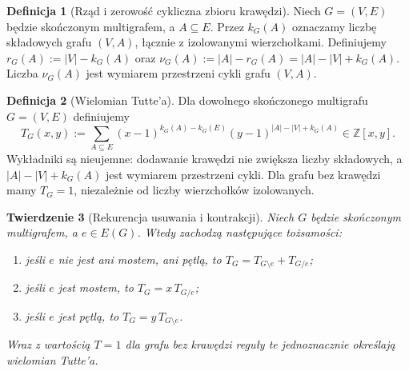 \documentclass[11pt,a4paper]{report}
\numberwithin{equation}{section}
\theoremstyle{plain}
\newtheorem{twierdzenie}{Twierdzenie}[section]
\theoremstyle{definition}
\newtheorem{definicja}[twierdzenie]{Definicja}
\theoremstyle{remark}
\begin{document}
\begin{definicja}[Rząd i zerowość cykliczna zbioru krawędzi]
Niech $G=(V,E)$ będzie skończonym multigrafem, a $A\subseteq E$.
Przez $k_G(A)$ oznaczamy liczbę składowych grafu $(V,A)$,
łącznie z izolowanymi wierzchołkami. Definiujemy
$r_G(A):=|V|-k_G(A)$ oraz
$\nu_G(A):=|A|-r_G(A)=|A|-|V|+k_G(A)$.
Liczba $\nu_G(A)$ jest wymiarem przestrzeni cykli grafu $(V,A)$.
\end{definicja}

\begin{definicja}[Wielomian Tutte'a]
\label{def:tg-tutte}
Dla dowolnego skończonego multigrafu $G=(V,E)$ definiujemy
\[
T_G(x,y):=\sum_{A\subseteq E}
 (x-1)^{k_G(A)-k_G(E)}
 (y-1)^{|A|-|V|+k_G(A)}\in\mathbb Z[x,y].
\]
Wykładniki są nieujemne: dodawanie krawędzi nie zwiększa liczby
składowych, a $|A|-|V|+k_G(A)$ jest wymiarem przestrzeni cykli.
Dla grafu bez krawędzi mamy $T_G=1$, niezależnie od liczby
wierzchołków izolowanych.
\end{definicja}

\begin{twierdzenie}[Rekurencja usuwania i kontrakcji]
\label{thm:tg-tutte-recursion}
Niech $G$ będzie skończonym multigrafem, a $e\in E(G)$.
Wtedy zachodzą następujące tożsamości:
\begin{enumerate}[label=(\roman*)]
\item jeśli $e$ nie jest ani mostem, ani pętlą, to
$T_G=T_{G\setminus e}+T_{G/e}$;
\item jeśli $e$ jest mostem, to $T_G=x\,T_{G/e}$;
\item jeśli $e$ jest pętlą, to $T_G=y\,T_{G\setminus e}$.
\end{enumerate}
Wraz z wartością $T=1$ dla grafu bez krawędzi reguły te
jednoznacznie określają wielomian Tutte'a.
\end{twierdzenie}
\end{document}
